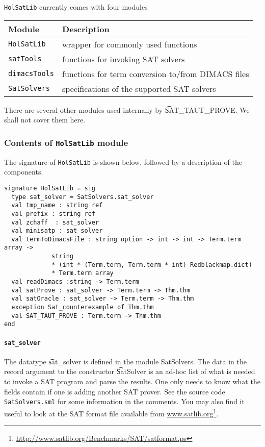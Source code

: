 {\tt HolSatLib} currently comes with four modules

\medskip

\begin{tabular}{ll}
{\bf Module} & {\bf Description} \\ \hline
{\tt HolSatLib} & wrapper for commonly used functions\\
{\tt satTools} & functions for invoking SAT solvers\\
{\tt dimacsTools} & functions for term conversion to/from DIMACS files\\
{\tt SatSolvers} & specifications of the supported SAT solvers\\
\end{tabular}

There are several other modules used internally by \t{SAT\_TAUT\_PROVE}. We shall not cover them here.
\medskip

\subsubsection{Contents of {\tt HolSatLib} module}

The signature of {\tt HolSatLib} is shown below, followed
by a description of the components.

{\small\begin{verbatim}
signature HolSatLib = sig
  type sat_solver = SatSolvers.sat_solver 
  val tmp_name : string ref
  val prefix : string ref
  val zchaff  : sat_solver
  val minisatp : sat_solver
  val termToDimacsFile : string option -> int -> int -> Term.term array ->
			 string 
			 * (int * (Term.term, Term.term * int) Redblackmap.dict) 
			 * Term.term array
  val readDimacs :string -> Term.term 
  val satProve : sat_solver -> Term.term -> Thm.thm
  val satOracle : sat_solver -> Term.term -> Thm.thm
  exception Sat_counterexample of Thm.thm
  val SAT_TAUT_PROVE : Term.term -> Thm.thm
end
\end{verbatim}}

\paragraph{\tt sat\_solver}${}$\\

The datatype \t{sat\_solver}  is defined in the module {SatSolvers}.
The data in the record argument to the constructor \t{SatSolver}
is an ad-hoc list of what is needed to invoke a SAT program
and parse the results. One only needs to know what the fields
contain if one is adding another SAT prover. See the
source code {\tt SatSolvers.sml} for some information
in the comments. You may also find it useful to look at the SAT format file available from \url{www.satlib.org}\footnote{\url{http://www.satlib.org/Benchmarks/SAT/satformat.ps}}.

